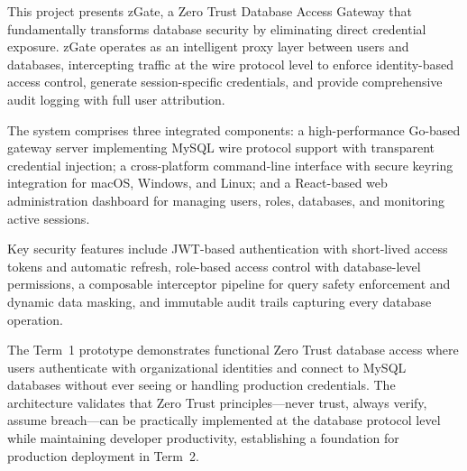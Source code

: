 \documentclass[12pt,a4paper]{report}
\begin{document}
This project presents zGate, a Zero Trust Database Access Gateway that fundamentally transforms database security by eliminating direct credential exposure. zGate operates as an intelligent proxy layer between users and databases, intercepting traffic at the wire protocol level to enforce identity-based access control, generate session-specific credentials, and provide comprehensive audit logging with full user attribution.

The system comprises three integrated components: a high-performance Go-based gateway server implementing MySQL wire protocol support with transparent credential injection; a cross-platform command-line interface with secure keyring integration for macOS, Windows, and Linux; and a React-based web administration dashboard for managing users, roles, databases, and monitoring active sessions.

Key security features include JWT-based authentication with short-lived access tokens and automatic refresh, role-based access control with database-level permissions, a composable interceptor pipeline for query safety enforcement and dynamic data masking, and immutable audit trails capturing every database operation.

The Term~1 prototype demonstrates functional Zero Trust database access where users authenticate with organizational identities and connect to MySQL databases without ever seeing or handling production credentials. The architecture validates that Zero Trust principles---never trust, always verify, assume breach---can be practically implemented at the database protocol level while maintaining developer productivity, establishing a foundation for production deployment in Term~2.

\newpage

\tableofcontents
\newpage

\listoffigures
\newpage

\listoftables
\thispagestyle{plain}
\newpage





















\end{document}
